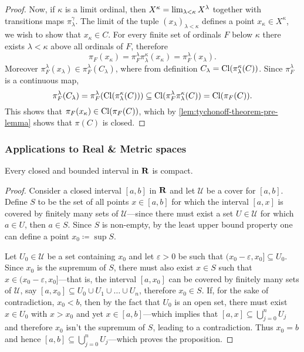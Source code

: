 \begin{proof}
    Now, if \(\kappa\) is a limit ordinal, then
    \(X^{\kappa} = \operatorname{lim}_{\lambda < \kappa} X^{\lambda}\) together with
    transitions maps \(\pi_{\lambda}^{\gamma}\). The limit of the tuple
    \((x_{\lambda})_{\lambda < \kappa}\) defines a point
    \(x_{\kappa} \in X^\kappa\), we wish to show that \(x_{\kappa} \in C\). For
    every finite set of ordinals \(F\) below \(\kappa\) there exists
    \(\lambda < \kappa\) above all ordinals of \(F\), therefore
    \[
        \pi_F(x_{\kappa})
        = \pi_F^{\lambda}\pi_{\lambda}^{\kappa}(x_{\kappa})
        = \pi_F^{\lambda}(x_{\lambda}).
    \]
    Moreover \(\pi_F^{\lambda}(x_{\lambda}) \in \pi_F^{\lambda}(C_{\lambda})\),
    where from definition \(C_{\lambda} =
    \operatorname{Cl}(\pi_{\lambda}^{\kappa}(C))\). Since \(\pi_F^{\lambda}\) is a
    continuous map,
    \[
        \pi_F^{\lambda}(C_{\lambda})
        = \pi_F^{\lambda}(\operatorname{Cl}(\pi_{\lambda}^{\kappa}(C)))
        \subseteq \operatorname{Cl}(\pi_F^{\lambda} \pi_{\lambda}^{\kappa}(C))
        = \operatorname{Cl}(\pi_F(C)).
    \]
    This shows that \(\pi_F(x_{\kappa}) \in \operatorname{Cl}(\pi_F(C))\), which by
    \cref{lem:tychonoff-theorem-pre-lemma} shows that \(\pi(C)\) is closed.
\end{proof}

\subsubsection{Applications to Real \& Metric spaces}

\begin{lemma}
    \label{lem:closed-interval-is-compact}
    Every closed and bounded interval in \(\mathbf{R}\) is compact.
\end{lemma}

\begin{proof}
    Consider a closed interval \([a, b]\) in \(\mathbf{R}\) and let \(\mathcal{U}\) be a
    cover for \([a, b]\). Define \(S\) to be the set of all points \(x \in [a, b]\)
    for which the interval \([a, x]\) is covered by finitely many sets of
    \(\mathcal{U}\)---since there must exist a set \(U \in \mathcal{U}\) for
    which \(a \in U\), then \(a \in S\). Since \(S\) is non-empty, by the
    least upper bound property one can define a point \(x_0 \coloneq \sup S\).

    Let \(U_0 \in \mathcal{U}\) be a set containing \(x_0\) and let
    \(\varepsilon > 0\) be such that \((x_0 - \varepsilon, x_0] \subseteq
    U_0\). Since \(x_0\) is the supremum of \(S\), there must also exist \(x \in S\)
    such that \(x \in (x_0 - \varepsilon, x_0]\)---that is, the interval
    \([a, x_0]\) can be covered by finitely many sets of \(\mathcal{U}\), say
    \([a, x_0] \subseteq U_0 \cup U_1 \cup \dots \cup U_n\), therefore
    \(x_0 \in S\). If, for the sake of contradiction, \(x_0 < b\), then by the fact
    that \(U_0\) is an open set, there must exist \(x \in U_0\) with \(x > x_0\) and
    yet \(x \in [a, b]\)---which implies that
    \([a, x] \subseteq \bigcup_{j=0}^n U_j\) and therefore \(x_0\)
    isn't the supremum of \(S\), leading to a contradiction. Thus \(x_0 = b\) and
    hence \([a, b] \subseteq \bigcup_{j=0}^n U_j\)---which proves the
    proposition.
\end{proof}


